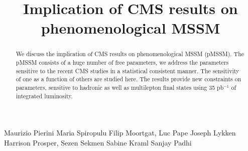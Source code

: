 \documentclass{cmspaper}
\begin{document}
%
\begin{titlepage}
\title{Implication of CMS results on phenomenological MSSM}

  \begin{Authlist}
    Maurizio Pierini
    Maria Spiropulu
    Filip Moortgat, Luc Pape
    Joseph Lykken
    Harrison Prosper, Sezen Sekmen
    Sabine Kraml
    Sanjay Padhi
    
  \end{Authlist}

\begin{abstract}
We discuss the implication of CMS results on phenomenological MSSM (pMSSM). The pMSSM
consists of a huge number of free parameters, we address the parameters sensitive 
to the recent CMS studies in a statistical consistent manner. The sensitivity of one as a function 
of others are studied here. The results provide new constraints on parameters, sensitive to hadronic as well as 
multilepton final states using 35 pb$^{-1}$ of integrated luminosity.
\end{abstract}
\end{titlepage}







\clearpage

\end{document}
